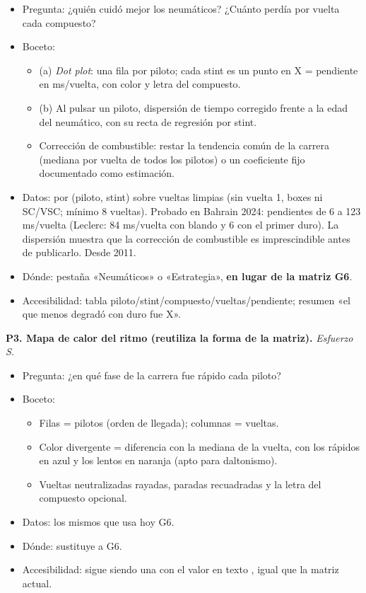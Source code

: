 \begin{itemize}
\item Pregunta: ¿quién cuidó mejor los neumáticos? ¿Cuánto perdía por vuelta cada compuesto?
\item Boceto:
\begin{itemize}
\item (a) \emph{Dot plot}: una fila por piloto; cada stint es un punto en X = pendiente en ms/vuelta, con color y letra del compuesto.
\item (b) Al pulsar un piloto, dispersión de tiempo corregido frente a la edad del neumático, con su recta de regresión por stint.
\item Corrección de combustible: restar la tendencia común de la carrera (mediana por vuelta de todos los pilotos) o un coeficiente fijo documentado como estimación.
\end{itemize}
\item Datos:  por (piloto, stint) sobre vueltas limpias (sin vuelta 1, boxes ni SC/VSC; mínimo 8 vueltas). Probado en Bahrain 2024: pendientes de 6 a 123 ms/vuelta (Leclerc: 84 ms/vuelta con blando y 6 con el primer duro). La dispersión muestra que la corrección de combustible es imprescindible antes de publicarlo. Desde 2011.
\item Dónde: pestaña «Neumáticos» o «Estrategia», \textbf{en lugar de la matriz G6}.
\item Accesibilidad: tabla piloto/stint/compuesto/vueltas/pendiente; resumen «el que menos degradó con duro fue X».
\end{itemize}

\textbf{P3. Mapa de calor del ritmo (reutiliza la forma de la matriz).} \emph{Esfuerzo S.}

\begin{itemize}
\item Pregunta: ¿en qué fase de la carrera fue rápido cada piloto?
\item Boceto:
\begin{itemize}
\item Filas = pilotos (orden de llegada); columnas = vueltas.
\item Color divergente = diferencia con la mediana de la vuelta, con los rápidos en azul y los lentos en naranja (apto para daltonismo).
\item Vueltas neutralizadas rayadas, paradas recuadradas y la letra del compuesto opcional.
\end{itemize}
\item Datos: los mismos  que usa hoy G6.
\item Dónde: sustituye a G6.
\item Accesibilidad: sigue siendo una  con el valor en texto , igual que la matriz actual.
\end{itemize}

